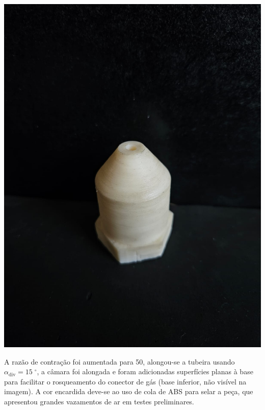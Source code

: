 \begin{minipage}{.49\textwidth}
    \includegraphics[width=\textwidth]{img/app_dev_history/motor2.jpeg}
\end{minipage}
\begin{minipage}{.49\textwidth}
    A razão de contração foi aumentada para 50, alongou-se a tubeira usando \(\alpha_{\mathrm{div}} = 15\;\mathrm{^\circ}\), a câmara foi alongada e foram adicionadas superfícies planas à base para facilitar o rosqueamento do conector de gás (base inferior, não visível na imagem). A cor encardida deve-se ao uso de cola de ABS para selar a peça, que apresentou grandes vazamentos de ar em testes preliminares.
\end{minipage}

